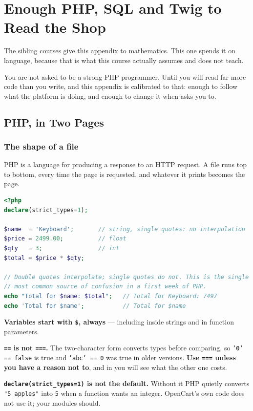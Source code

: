 \chapter{Enough PHP, SQL and Twig to Read the Shop}\label{app:languages}
\normalfigures

The sibling courses give this appendix to mathematics. This one spends it on
language, because that is what this course actually assumes and does not teach.

You are not asked to be a strong PHP programmer. Until  you will
read far more code than you write, and this appendix is calibrated to that:
enough to follow what the platform is doing, and enough to change it when
 asks you to.

\section{PHP, in Two Pages}

\subsection{The shape of a file}

PHP is a language for producing a response to an HTTP request. A file runs top
to bottom, every time the page is requested, and whatever it prints becomes the
page.

\begin{lstlisting}[language=php]
<?php
declare(strict_types=1);

$name  = 'Keyboard';       // string, single quotes: no interpolation
$price = 2499.00;          // float
$qty   = 3;                // int
$total = $price * $qty;

// Double quotes interpolate; single quotes do not. This is the single
// most common source of confusion in a first week of PHP.
echo "Total for $name: $total";   // Total for Keyboard: 7497
echo 'Total for $name';           // Total for $name
\end{lstlisting}

\begin{alertbox}
\textbf{Variables start with \texttt{\$}, always} --- including inside strings
and in function parameters.

\smallskip
\textbf{\texttt{==} is not \texttt{===}.} The two-character form converts types
before comparing, so \texttt{'0' == false} is true and \texttt{'abc' == 0} was
true in older versions. \textbf{Use \texttt{===} unless you have a reason not
to}, and in  you will see what the other one costs.

\smallskip
\textbf{\texttt{declare(strict\_types=1)} is not the default.} Without it PHP
quietly converts \texttt{"5 apples"} into \texttt{5} when a function wants an
integer. OpenCart's own code does not use it; your modules should.
\end{alertbox}


